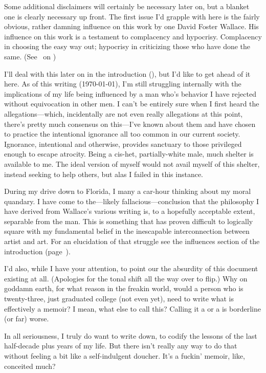 \setlength{\parskip}{0.75\baselineskip}
\label{chap:disclaimer}
{\normalsize Some additional disclaimers will certainly be necessary later on, but a blanket one is clearly necessary up front.
The first issue I'd grapple with here is the fairly obvious, rather damning influence on this work by one David Foster Wallace.
His influence on this work is a testament to complacency and hypocrisy.
Complacency in choosing the easy way out; hypocrisy in criticizing those who have done the same.
(See~ on )

I'll deal with this later on in the introduction (), but I'd like to get ahead of it here.
As of this writing (\today), I'm still struggling internally with the implications of my life being influenced by a man who's behavior I have rejected without equivocation in other men.
I can't be entirely sure when I first heard the allegations---which, incidentally are not even really allegations at this point, there's pretty much consensus on this---I've known about them and have chosen to practice the intentional ignorance all too common in our current society.
Ignorance, intentional and otherwise, provides sanctuary to those privileged enough to escape atrocity.
Being a cis-het, partially-white male, much shelter is available to me.
The ideal version of myself would not avail myself of this shelter, instead seeking to help others, but alas I failed in this instance.

During my drive down to Florida, I many a car-hour thinking about my moral quandary.
I have come to the---likely fallacious---conclusion that the philosophy I have derived from Wallace's various writing is, to a hopefully acceptable extent, separable from the man.
This is something that has proven difficult to logically square with my fundamental belief in the inescapable interconnection between artist and art.
For an elucidation of that struggle see the influences section of the introduction (page~\pageref{sec:influences}).

I'd also, while I have your attention, to point our the absurdity of this document existing at all.
(Apologies for the tonal shift all the way over to flip.)
Why on goddamn earth, for what reason in the freakin world, would a person who is twenty-three, just graduated college (not even yet), need to write what is effectively a memoir?
I mean, what else to call this?
Calling it a  or a  is borderline (or far) worse.

In all seriousness, I truly do want to write down, to codify the lessons of the last half-decade plus years of my life.
But there isn't really any way to do that without feeling a bit like a self-indulgent doucher.
It's a fuckin' memoir, like, conceited much?}

